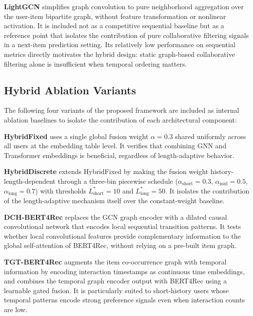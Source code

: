 \documentclass[12pt,a4paper]{report}
\begin{document}
\textbf{LightGCN} \citep{he2020lightgcn} simplifies graph convolution to pure
neighborhood aggregation over the user-item bipartite graph, without feature
transformation or nonlinear activation. It is included not as a competitive
sequential baseline but as a reference point that isolates the contribution of
pure collaborative filtering signals in a next-item prediction setting. Its
relatively low performance on sequential metrics directly motivates the hybrid
design: static graph-based collaborative filtering alone is insufficient when
temporal ordering matters.

\subsection*{Hybrid Ablation Variants}

The following four variants of the proposed framework are included as internal
ablation baselines to isolate the contribution of each architectural component:

\textbf{HybridFixed} uses a single global fusion weight \(\alpha = 0.3\) shared
uniformly across all users at the embedding table level. It verifies that
combining GNN and Transformer embeddings is beneficial, regardless of
length-adaptive behavior.

\textbf{HybridDiscrete} extends HybridFixed by making the fusion weight
history-length-dependent through a three-bin piecewise schedule
(\(\alpha_{\text{short}} = 0.3\), \(\alpha_{\text{mid}} = 0.5\),
\(\alpha_{\text{long}} = 0.7\)) with thresholds \(L^*_{\text{short}} = 10\) and
\(L^*_{\text{long}} = 50\). It isolates the contribution of the length-adaptive
mechanism itself over the constant-weight baseline.

\textbf{DCH-BERT4Rec} replaces the GCN graph encoder with a dilated causal
convolutional network that encodes local sequential transition patterns. It
tests whether local convolutional features provide complementary information
to the global self-attention of BERT4Rec, without relying on a pre-built item
graph.

\textbf{TGT-BERT4Rec} augments the item co-occurrence graph with temporal
information by encoding interaction timestamps as continuous time embeddings,
and combines the temporal graph encoder output with BERT4Rec using a learnable
gated fusion. It is particularly suited to short-history users whose temporal
patterns encode strong preference signals even when interaction counts are low.
\end{document}
